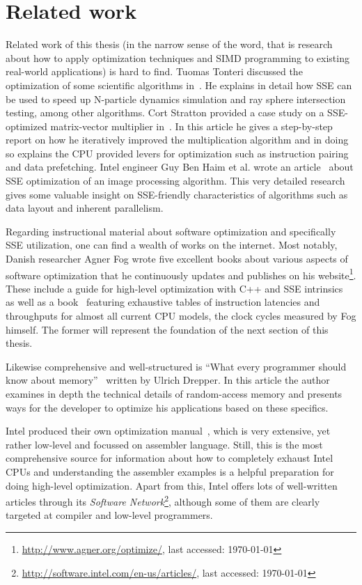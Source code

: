 \section{Related work}
\label{Related_work}

Related work of this thesis (in the narrow sense of the word, that is research about how to apply optimization techniques and SIMD programming to existing real-world applications) is hard to find. Tuomas Tonteri discussed the optimization of some scientific algorithms in~\cite{tonteri2012}. He explains in detail how SSE can be used to speed up N-particle dynamics simulation and ray sphere intersection testing, among other algorithms. Cort Stratton provided a case study on a SSE-optimized matrix-vector multiplier in~\cite{stratton2002}. In this article he gives a step-by-step report on how he iteratively improved the multiplication algorithm and in doing so explains the CPU provided levers for optimization such as instruction pairing and data prefetching. Intel engineer Guy Ben Haim et al. wrote an article~\cite{haim2009} about SSE optimization of an image processing algorithm. This very detailed research gives some valuable insight on SSE-friendly characteristics of algorithms such as data layout and inherent parallelism.

Regarding instructional material about software optimization and specifically SSE utilization, one can find a wealth of works on the internet. Most notably, Danish researcher Agner Fog wrote five excellent books about various aspects of software optimization that he continuously updates and publishes on his website\footnote{\url{http://www.agner.org/optimize/}, last accessed: \today{}}. These include a guide for high-level optimization with C++ and SSE intrinsics~\cite{fog2011optimizing} as well as a book~\cite{fog2011instructiontables} featuring exhaustive tables of instruction latencies and throughputs for almost all current CPU models, the clock cycles measured by Fog himself. The former will represent the foundation of the next section of this thesis.

Likewise comprehensive and well-structured is ``What every programmer should know about memory''~\cite{drepper2007memory} written by Ulrich Drepper. In this article the author examines in depth the technical details of random-access memory and presents ways for the developer to optimize his applications based on these specifics.

Intel produced their own optimization manual~\cite{intel2011manual}, which is very extensive, yet rather low-level and focussed on assembler language. Still, this is the most comprehensive source for information about how to completely exhaust Intel CPUs and understanding the assembler examples is a helpful preparation for doing high-level optimization. Apart from this, Intel offers lots of well-written articles through its \emph{Software Network}\footnote{\url{http://software.intel.com/en-us/articles/}, last accessed: \today{}}, although some of them are clearly targeted at compiler and low-level programmers.

